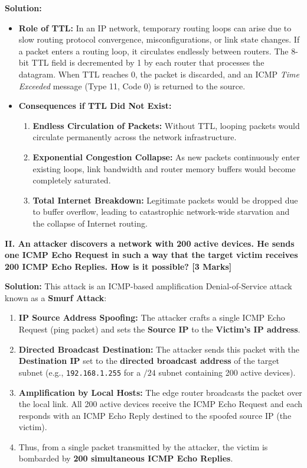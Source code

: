 \documentclass[11pt,a4paper]{article}
\begin{document}
\textbf{Solution:}
\begin{itemize}
    \item \textbf{Role of TTL:}
    In an IP network, temporary routing loops can arise due to slow routing protocol convergence, misconfigurations, or link state changes. If a packet enters a routing loop, it circulates endlessly between routers. The 8-bit TTL field is decremented by 1 by each router that processes the datagram. When TTL reaches 0, the packet is discarded, and an ICMP \emph{Time Exceeded} message (Type 11, Code 0) is returned to the source.
    \item \textbf{Consequences if TTL Did Not Exist:}
    \begin{enumerate}
        \item \textbf{Endless Circulation of Packets:} Without TTL, looping packets would circulate permanently across the network infrastructure.
        \item \textbf{Exponential Congestion Collapse:} As new packets continuously enter existing loops, link bandwidth and router memory buffers would become completely saturated.
        \item \textbf{Total Internet Breakdown:} Legitimate packets would be dropped due to buffer overflow, leading to catastrophic network-wide starvation and the collapse of Internet routing.
    \end{enumerate}
\end{itemize}

\vspace{0.2cm}
\textbf{II. An attacker discovers a network with 200 active devices. He sends one ICMP Echo Request in such a way that the target victim receives 200 ICMP Echo Replies. How is it possible? [3 Marks]}

\textbf{Solution:}
This attack is an ICMP-based amplification Denial-of-Service attack known as a \textbf{Smurf Attack}:
\begin{enumerate}
    \item \textbf{IP Source Address Spoofing:} The attacker crafts a single ICMP Echo Request (ping packet) and sets the \textbf{Source IP} to the \textbf{Victim's IP address}.
    \item \textbf{Directed Broadcast Destination:} The attacker sends this packet with the \textbf{Destination IP} set to the \textbf{directed broadcast address} of the target subnet (e.g., \texttt{192.168.1.255} for a $/24$ subnet containing 200 active devices).
    \item \textbf{Amplification by Local Hosts:} The edge router broadcasts the packet over the local link. All 200 active devices receive the ICMP Echo Request and each responds with an ICMP Echo Reply destined to the spoofed source IP (the victim).
    \item Thus, from a single packet transmitted by the attacker, the victim is bombarded by \textbf{200 simultaneous ICMP Echo Replies}.
\end{enumerate}
\end{document}
